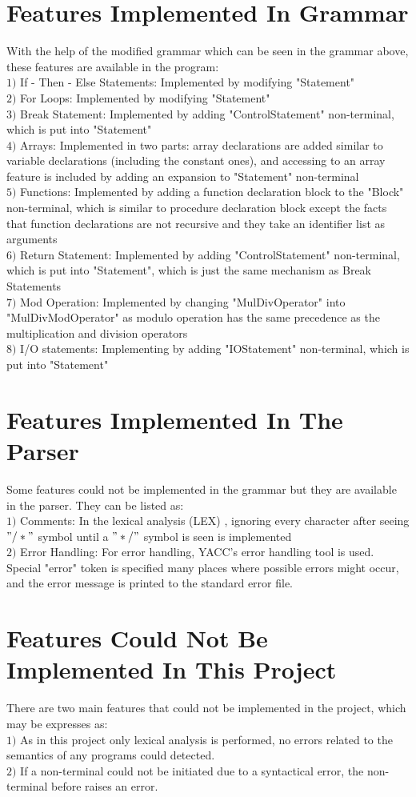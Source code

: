 \documentclass[a4paper,11pt]{article}
\begin{document}
\section{Features Implemented In Grammar}
With the help of the modified grammar which can be seen in the grammar above, these features are available in the program: \\
$1)$ If - Then - Else Statements: Implemented by modifying "Statement" \\
$2)$ For Loops: Implemented by modifying "Statement" \\
$3)$ Break Statement: Implemented by adding "ControlStatement" non-terminal, which is put into "Statement" \\
$4)$ Arrays:  Implemented in two parts: array declarations are added similar to variable declarations (including the constant ones), and accessing to an array feature is included by adding an expansion to "Statement" non-terminal \\
$5)$ Functions: Implemented by adding a function declaration block to the "Block" non-terminal, which is similar to procedure declaration block except the facts that function declarations are not recursive and they take an identifier list as arguments \\
$6)$ Return Statement:  Implemented by adding "ControlStatement" non-terminal, which is put into "Statement", which is just the same mechanism as Break Statements \\
$7)$ Mod Operation: Implemented by changing "MulDivOperator" into "MulDivModOperator" as modulo operation has the same precedence as the multiplication and division operators \\
$8)$ I/O statements: Implementing by adding "IOStatement" non-terminal, which is put into "Statement" 

\section{Features Implemented In The Parser}
Some features could not be implemented in the grammar but they are available in the parser. They can be listed as: \\
$1)$ Comments: In the lexical analysis (LEX) , ignoring every character after seeing $"/*"$ symbol until a $"*/"$ symbol is seen is implemented \\
$2)$ Error Handling: For error handling, YACC's error handling tool is used. Special "error" token is specified many places where possible errors might occur, and the error message is printed to the standard error file. 

\section{Features Could Not Be Implemented In This Project}
There are two main features that could not be implemented in the project, which may be expresses as: \\
$1)$ As in this project only lexical analysis is performed, no errors related to the semantics of any programs could detected. \\
$2)$ If a non-terminal could not be initiated due to a syntactical error, the non-terminal before raises an error.
\end{document}
